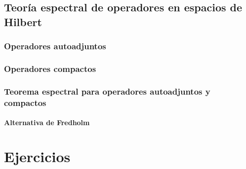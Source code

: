 \documentclass[palatino,nochap]{apuntes}
\begin{document}
\section{Teoría espectral de operadores en espacios de Hilbert}

\subsection{Operadores autoadjuntos}

\subsection{Operadores compactos}

\subsection{Teorema espectral para operadores autoadjuntos y compactos}

\subsubsection{Alternativa de Fredholm}

\appendix

\chapter{Ejercicios}


\printindex
\end{document}
